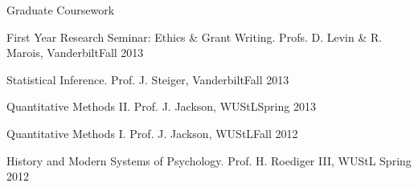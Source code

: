 \documentclass [11pt,letterpaper]{article}
\begin{document}
\begin{rSection}{\textrm{Graduate Coursework}}
\begin{etaremune}
\item First Year Research Seminar: Ethics \& Grant Writing. Profs. D. Levin \& R. Marois, Vanderbilt\hfill  {Fall 2013}
\item Statistical Inference. Prof. J. Steiger, Vanderbilt\hfill  {Fall 2013}
\item Quantitative Methods \textrm{II}. Prof. J. Jackson, WUStL\hfill  {Spring 2013}
\item Quantitative Methods \textrm{I}. Prof. J. Jackson, WUStL\hfill  {Fall 2012}
\item History and Modern Systems of Psychology. Prof. H. Roediger \textrm{III}, WUStL \hfill  {Spring 2012}\end{etaremune}
\begin{comment}
{\large \textbf{Supplemental Training}}\\
Data Mining. Prof. R. Stine, U. of Michigan\hfill  {Summer 2014}\smallskip\\
Intro. to Human Behavioral Genetics. Coursera, U. of Minnesota\hfill{Summer 2014}%
\smallskip\\
Big Data and Social Physics. edX, MIT\hfill{Summer 2014}%
\smallskip\\
Statistical Analysis of fMRI Data. Coursera, Johns Hopkins\hfill{Winter 2014}%
\smallskip\\
Social Epidemiology. Coursera, U. of Minnesota\hfill{Summer 2013}%
\vspace{-2mm}\begin{center}\footnotesize{ \textit{upcoming} or \textit{in progress}
}\end{center} \vspace{-4mm}
\end{comment}
\end{rSection}
\end{document}

